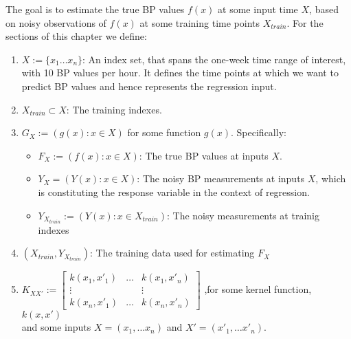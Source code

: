 The goal is to estimate the true BP values $f(x)$ at some input time $X$,
based on noisy observations of $f(x)$ at some training time points $X_{train}$.
For the sections of this chapter we define:
\begin{enumerate}
    \item $X := \{ x_1 \dots x_n \}$: An index set, that spans
    the one-week time range of interest, with 10 BP values per hour.
    It defines the time points at which we want to predict BP values and
    hence represents the regression input.

    \item $X_{train} \subset X$: The training indexes. \\

    \item $G_X := (g(x) : x \in X )$ for some function $g(x)$.
    Specifically:
    \begin{itemize}
        \item $F_X := (f(x) : x \in X )$: The true BP values at inputs $X$.
        \item $Y_X= (Y(x) : x \in X )$: The noisy BP measurements at inputs $X$, which
        is constituting the response variable in the context of regression.
        \item $Y_{X_{train}} := (Y(x) : x \in X_{train})$: The noisy measurements at trainig indexes
    \end{itemize}


    \item $(X_{train}, Y_{X_{train}})$: The training data used for estimating $F_X$



    \item $K_{XX'} := \begin{bmatrix}
            k(x_1, x'_1) & \dots & k(x_1, x'_n)\\
            \vdots  &  & \vdots \\
            k(x_n, x'_1) & \dots  & k(x_n, x'_n)
         \end{bmatrix}$ ,for some kernel function, $k(x, x')$ \\

        and some inputs $X=(x_1, \dots x_n)$ and $X'=(x'_1, \dots x'_n)$.
\end{enumerate}

